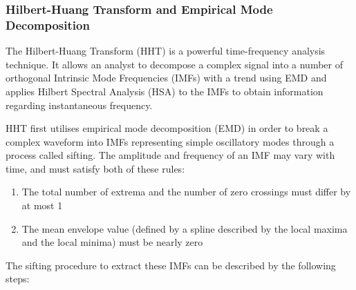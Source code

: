 \documentclass[
  paper=a4,
  ,captions=tableheading
]{scrartcl}
\begin{document}
\hypertarget{hilbert-huang-transform-and-empirical-mode-decomposition}{%
\subsubsection{Hilbert-Huang Transform and Empirical Mode
Decomposition}\label{hilbert-huang-transform-and-empirical-mode-decomposition}}

The Hilbert-Huang Transform (HHT) is a powerful time-frequency analysis
technique. It allows an analyst to decompose a complex signal into a
number of orthogonal Intrinsic Mode Frequencies (IMFs) with a trend
using EMD and applies Hilbert Spectral Analysis (HSA) to the IMFs to
obtain information regarding instantaneous frequency.

HHT first utilises empirical mode decomposition (EMD) in order to break
a complex waveform into IMFs representing simple oscillatory modes
through a process called sifting. The amplitude and frequency of an IMF
may vary with time, and must satisfy both of these rules: 

\begin{enumerate}
	\item The total number of extrema and the number of zero crossings must differ by at most 1 
	\item The mean envelope value (defined by a spline described by the local maxima and the local minima) must be nearly zero
\end{enumerate}

The sifting procedure to extract these IMFs can be described by the following steps: 
\end{document}
